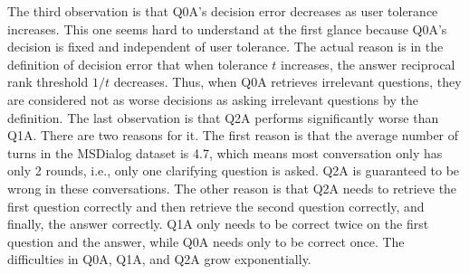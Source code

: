 \documentclass[format=acmsmall, review=False, screen=true]{acmart}
\begin{document}
The third observation is that Q0A's decision error decreases as user tolerance increases. This one seems hard to understand at the first glance because Q0A's decision is fixed and independent of user tolerance. The actual reason is in the definition of decision error that when tolerance $t$ increases, the answer reciprocal rank threshold $1/t$ decreases. Thus, when Q0A retrieves irrelevant questions, they are considered not as worse decisions as asking irrelevant questions by the definition. The last observation is that Q2A performs significantly worse than Q1A. There are two reasons for it. The first reason is that the average number of turns in the MSDialog dataset is 4.7, which means most conversation only has only 2 rounds, i.e., only one clarifying question is asked. Q2A is guaranteed to be wrong in these conversations. The other reason is that Q2A needs to retrieve the first question correctly and then retrieve the second question correctly, and finally, the answer correctly. Q1A only needs to be correct twice on the first question and the answer, while Q0A needs only to be correct once. The difficulties in Q0A, Q1A, and Q2A grow exponentially. 
\end{document}
